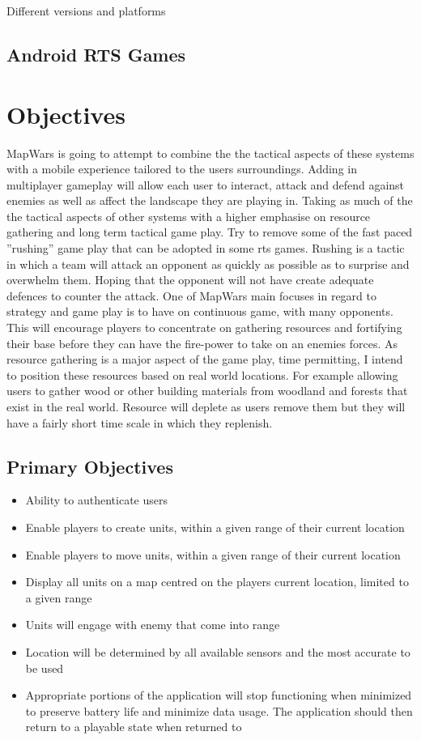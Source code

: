Different versions and platforms


\subsection{Android RTS Games}


\section{Objectives}
MapWars is going to attempt to combine the the tactical aspects of these systems with a mobile experience tailored to the users surroundings. Adding in multiplayer gameplay will allow each user to interact, attack and defend against enemies as well as affect the landscape they are playing in. Taking as much of the the tactical aspects of other systems with a higher emphasise on resource gathering and long term tactical game play. Try to remove some of the fast paced ”rushing” game play that can be adopted in some \gls{rts} games. Rushing is a tactic in which a team will attack an opponent as quickly as possible as to surprise and overwhelm them. Hoping that the opponent will not have create adequate defences to counter the attack. One of MapWars main focuses in regard to strategy and game play is to have on continuous game, with many opponents. This will encourage players to concentrate on gathering resources and fortifying their base before they can have the fire-power to take on an enemies forces. As resource gathering is a major aspect of the game play, time permitting, I intend to position these resources based on real world locations. For example allowing users to gather wood or other building materials from woodland and forests that exist in the real world. Resource will deplete as users remove them but they will have a fairly short time scale in which they replenish.

\subsection{Primary Objectives}
\begin{itemize}
\item Ability to authenticate users
\item Enable players to create units, within a given range of their current location
\item Enable players to move units, within a given range of their current location
\item Display all units on a map centred on the players current location, limited to a given range
\item Units will engage with enemy that come into range
\item Location will be determined by all available sensors and the most accurate to be used
\item Appropriate portions of the application will stop functioning when minimized to preserve battery life and minimize data usage. The application should then return to a playable state when returned to
\end{itemize} 

